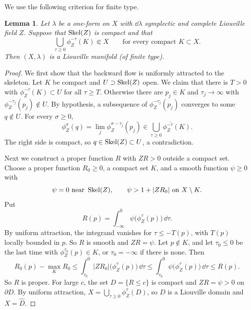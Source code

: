 \documentclass[12pt, letter]{amsart}
\newtheorem{lemma}[dummy]{Lemma}
\theoremstyle{definition}
\begin{document}
We use the following criterion for finite type.

\begin{lemma}\label{lem:finite-type}
Let $\lambda$ be a one-form on $X$ with $\dd\lambda$ symplectic and complete Liouville field $Z$.
Suppose that $\operatorname{Skel}(Z)$ is compact and that
\[
 \bigcup_{\tau\ge0}\phi_Z^{-\tau}(K)\Subset X\qquad\text{for every compact }K\subset X .
\]
Then $(X,\lambda)$ is a Liouville manifold (of finite type).
\end{lemma}

\begin{proof}
We first show that the backward flow is uniformly attracted to the skeleton.
Let $K$ be compact and $U\supset\operatorname{Skel}(Z)$ open.
We claim that there is $T>0$ with $\phi_Z^{-\tau}(K)\subset U$ for all $\tau\ge T$.
Otherwise there are $p_j\in K$ and $\tau_j\to\infty$ with $\phi_Z^{-\tau_j}(p_j)\notin U$.
By hypothesis, a subsequence of $\phi_Z^{-\tau_j}(p_j)$ converges to some $q\notin U$.
For every $\sigma\ge0$,
\[
 \phi_Z^{\sigma}(q)=\lim_j\phi_Z^{\sigma-\tau_j}(p_j)\in\overline{\textstyle\bigcup_{\tau\ge0}\phi_Z^{-\tau}(K)} .
\]
The right side is compact, so $q\in\operatorname{Skel}(Z)\subset U$, a contradiction.

Next we construct a proper function $R$ with $ZR>0$ outside a compact set.
Choose a proper function $R_0\ge0$, a compact set $K$, and a smooth function $\psi\ge0$ with
\[
 \psi=0\ \text{near }\operatorname{Skel}(Z),\qquad \psi>1+|ZR_0|\ \text{on }X\setminus K.
\]
Put
\[
 R(p)=\int_{-\infty}^0\psi\bigl(\phi_Z^{\tau}(p)\bigr)\,\dd\tau .
\]
By uniform attraction, the integrand vanishes for $\tau\le-T(p)$, with $T(p)$ locally bounded in $p$.
So $R$ is smooth and $ZR=\psi$.
Let $p\notin K$, and let $\tau_0\le0$ be the last time with $\phi_Z^{\tau_0}(p)\in K$, or $\tau_0=-\infty$ if there is none.
Then
\[
 R_0(p)-\max_KR_0\le\int_{\tau_0}^0|ZR_0|\bigl(\phi_Z^\tau(p)\bigr)\,\dd\tau\le\int_{\tau_0}^0\psi\bigl(\phi_Z^\tau(p)\bigr)\,\dd\tau\le R(p).
\]
So $R$ is proper.
For large $c$, the set $D=\{R\le c\}$ is compact and $ZR=\psi>0$ on $\partial D$.
By uniform attraction, $X=\bigcup_{\tau\ge0}\phi_Z^\tau(D)$, so $D$ is a Liouville domain and $X=\widehat D$.
\end{proof}
\end{document}
